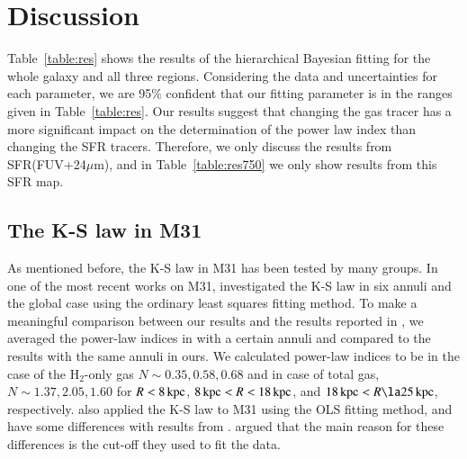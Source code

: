 %
\section{Discussion}

Table~\ref{table:res} shows the results of the hierarchical Bayesian fitting for the whole galaxy and all three regions. Considering the data and uncertainties for each parameter, we are 95\% confident that our fitting parameter is in the ranges given in Table~\ref{table:res}.
Our results suggest that changing the gas tracer has a more significant impact on the determination of the power law index than changing the SFR tracers. Therefore, we only discuss the results from SFR(FUV+24$\mu$m), and in Table~\ref{table:res750} we only show results from this SFR map.

\subsection{The K-S law in M31}

As mentioned before, the K-S law in M31 has been tested by many groups. In one of the most recent works on M31, \citet{Ford13} investigated the K-S law in six annuli and the global case using the ordinary least squares fitting method. 
To make a meaningful comparison between our results and the results reported in \citet{Ford13}, we averaged the power-law indices in \citet{Ford13} with a certain annuli and compared to the results with the same annuli in ours. We calculated power-law indices to be in the case of the H$_{2}$-only gas $N \sim 0.35, 0.58, 0.68$ and in case of total gas, $N \sim 1.37, 2.05, 1.60$ for $R< 8\,{\rm kpc}$, $8\,{\rm kpc} < R < 18\,{\rm kpc}$, and $18\kpc < R \la 25\kpc$, respectively.
\citet{Tabatabaei10} also applied the K-S law to M31 using the OLS fitting method, and have some differences with results from \citet{Ford13}. \citet{Ford13} argued that the main reason for these differences is the cut-off they used to fit the data. 
 
